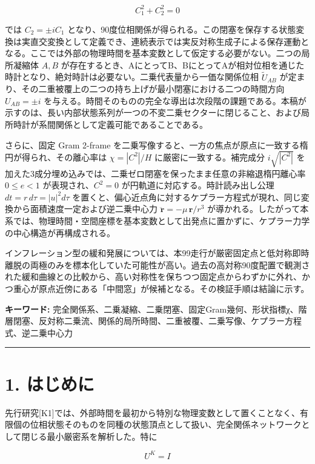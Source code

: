 \documentclass[
  a4paper,
]{ltjsarticle}
\begin{document}
\[
C_1^2+C_2^2=0
\]

では \(C_2=\pm iC_1\)
となり、90度位相関係が得られる。この閉塞を保存する状態変換は実直交変換として定義でき、連続表示では実反対称生成子による保存運動となる。ここでは外部の物理時間を基本変数として仮定する必要がない。二つの局所凝縮体
\(A,B\)
が存在するとき、AにとってB、BにとってAが相対位相を通じた時計となり、絶対時計は必要ない。二乗代表量から一価な関係位相
\(\tilde U_{AB}\)
が定まり、その二重被覆上の二つの持ち上げが最小閉塞における二つの時間方向
\(U_{AB}=\pm i\)
を与える。時間そのものの完全な導出は次段階の課題である。本稿が示すのは、長い内部状態系列が一つの不変二乗セクターに閉じること、および局所時計が系間関係として定義可能であることである。

さらに、固定 Gram 2-frame
を二乗写像すると、一方の焦点が原点に一致する楕円が得られ、その離心率は
\(\chi=|C^2|/H\) に厳密に一致する。補完成分 \(i\sqrt{|C^2|}\)
を加えた3成分埋め込みでは、二乗ゼロ閉塞を保ったまま任意の非縮退楕円離心率
\(0\le e<1\) が表現され、\(C^2=0\) が円軌道に対応する。時計読み出し公理
\(dt=r\,d\tau=|u|^2d\tau\)
を置くと、偏心近点角に対するケプラー方程式が現れ、同じ変換から面積速度一定および逆二乗中心力
\(\ddot{\mathbf r}=-\mu\,\mathbf r/r^3\)
が導かれる。したがって本系では、物理時間・空間座標を基本変数として出発点に置かずに、ケプラー力学の中心構造が再構成される。

インフレーション型の緩和発展については、本99走行が厳密固定点と低対称即時離脱の両極のみを標本化していた可能性が高い。過去の高対称90度配置で観測された緩和曲線との比較から、高い対称性を保ちつつ固定点からわずかに外れ、かつ重心が原点近傍にある「中間窓」が候補となる。その検証手順は結論に示す。

\textbf{キーワード:}
完全関係系、二乗凝縮、二乗閉塞、固定Gram幾何、形状指標χ、階層閉塞、反対称二乗流、関係的局所時間、二重被覆、二乗写像、ケプラー方程式、逆二乗中心力

\begin{center}\rule{0.5\linewidth}{0.5pt}\end{center}

\section{1. はじめに}\label{ux306fux3058ux3081ux306b}

先行研究{[}K1{]}では、外部時間を最初から特別な物理変数として置くことなく、有限個の位相状態そのものを同種の状態頂点として扱い、完全関係ネットワークとして閉じる最小厳密系を解析した。特に

\[
U^K=I
\]
\end{document}
